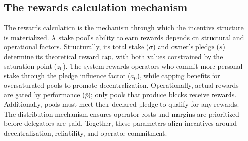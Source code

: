 \documentclass[11pt, letterpaper]{article}
\begin{document}
\subsection{The rewards calculation mechanism}

The rewards calculation is the mechanism through which the incentive structure
is materialized. A stake pool's ability to earn rewards depends on structural
and operational factors. Structurally, its total stake ($\sigma$) and owner's
pledge ($s$) determine its theoretical reward cap, with both values constrained
by the saturation point ($z_{0}$). The system rewards operators who commit more
personal stake through the pledge influence factor ($a_{0}$), while capping
benefits for oversaturated pools to promote decentralization. Operationally,
actual rewards are gated by performance ($\bar{p}$); only pools that produce
blocks receive rewards. Additionally, pools must meet their declared pledge to
qualify for any rewards. The distribution mechanism ensures operator costs and
margins are prioritized before delegators are paid. Together, these parameters
align incentives around decentralization, reliability, and operator commitment.
\end{document}
